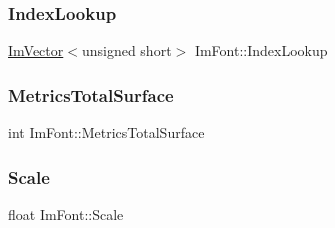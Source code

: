 \subsubsection{\texorpdfstring{Index\+Lookup}{IndexLookup}}
{\footnotesize\ttfamily \hyperlink{class_im_vector}{Im\+Vector}$<$unsigned short$>$ Im\+Font\+::\+Index\+Lookup}

\hypertarget{struct_im_font_a8087b2ee8b27dcf5c6e30a8318f87cc7}{}\label{struct_im_font_a8087b2ee8b27dcf5c6e30a8318f87cc7} 
\subsubsection{\texorpdfstring{Metrics\+Total\+Surface}{MetricsTotalSurface}}
{\footnotesize\ttfamily int Im\+Font\+::\+Metrics\+Total\+Surface}

\hypertarget{struct_im_font_ae98fb07fd8862a7243d77b11f38bba19}{}\label{struct_im_font_ae98fb07fd8862a7243d77b11f38bba19} 
\subsubsection{\texorpdfstring{Scale}{Scale}}
{\footnotesize\ttfamily float Im\+Font\+::\+Scale}

